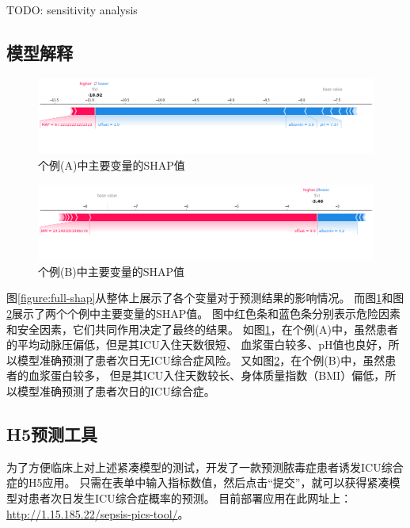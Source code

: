 TODO: sensitivity analysis

\subsection{模型解释}

\begin{figure}[htbp]
    \centering
    \includegraphics[width=\linewidth]{../img/eicu_compact_shap_force_neg.png}
    \vspace{-4em}
    \caption{个例(A)中主要变量的SHAP值}
    \label{figure:shap-neg}
\end{figure}

\begin{figure}[htbp]
    \centering
    \includegraphics[width=\linewidth]{../img/eicu_compact_shap_force_pos.png}
    \vspace{-4em}
    \caption{个例(B)中主要变量的SHAP值}
    \label{figure:shap-pos}
\end{figure}

图\ref{figure:full-shap}从整体上展示了各个变量对于预测结果的影响情况。%
而图\ref{figure:shap-neg}和图\ref{figure:shap-pos}展示了两个个例中主要变量的SHAP值。%
图中红色条和蓝色条分别表示危险因素和安全因素，它们共同作用决定了最终的结果。%
如图\ref{figure:shap-neg}，在个例(A)中，虽然患者的平均动脉压偏低，但是其ICU入住天数很短、%
血浆蛋白较多、pH值也良好，所以模型准确预测了患者次日无ICU综合症风险。%
又如图\ref{figure:shap-pos}，在个例(B)中，虽然患者的血浆蛋白较多，%
但是其ICU入住天数较长、身体质量指数（BMI）偏低，所以模型准确预测了患者次日的ICU综合症。

\subsection{H5预测工具}

\newcommand\PredictionToolURL{http://1.15.185.22/sepsis-pics-tool/}

为了方便临床上对上述紧凑模型的测试，开发了一款预测脓毒症患者诱发ICU综合症的H5应用。%
只需在表单中输入指标数值，然后点击“提交”，就可以获得紧凑模型对患者次日发生ICU综合症概率的预测。%
目前部署应用在此网址上：\url{\PredictionToolURL}。
